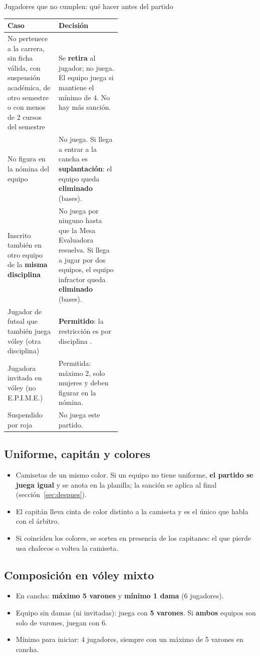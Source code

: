 \begin{cajaImportante}{Jugadores que no cumplen: qué hacer antes del partido}
	\renewcommand{\arraystretch}{1.3}
	\noindent\begin{tabularx}{\linewidth}{>{\RaggedRight\arraybackslash}p{0.45\linewidth} >{\RaggedRight\arraybackslash}X}
		\textbf{Caso} & \textbf{Decisión}\\ \hline
		No pertenece a la carrera, sin ficha válida, con suspensión académica, de otro semestre o con menos de 2 cursos del semestre & Se \textbf{retira} al jugador; no juega. El equipo juega si mantiene el mínimo de 4. No hay más sanción.\\
		No figura en la nómina del equipo & No juega. Si llega a entrar a la cancha es \textbf{suplantación}: el equipo queda \textbf{eliminado} (bases).\\
		Inscrito también en otro equipo de la \textbf{misma disciplina} & No juega por ninguno hasta que la Mesa Evaluadora resuelva. Si llega a jugar por dos equipos, el equipo infractor queda \textbf{eliminado} (bases).\\
		Jugador de futsal que también juega vóley (otra disciplina) & \textbf{Permitido}: la restricción es por disciplina \crit{2}.\\
		Jugadora invitada en vóley (no E.P.I.M.E.) & Permitida: máximo 2, solo mujeres y deben figurar en la nómina.\\
		Suspendido por roja & No juega este partido.\\
	\end{tabularx}
\end{cajaImportante}

\subsection{Uniforme, capitán y colores}
\begin{itemize}
	\item Camisetas de un mismo color. Si un equipo no tiene uniforme, \textbf{el partido se juega igual} y se anota en la planilla; la sanción se aplica al final (sección~\ref{sec:despues}).
	\item El capitán lleva cinta de color distinto a la camiseta y es el único que habla con el árbitro.
	\item Si coinciden los colores, se sortea en presencia de los capitanes: el que pierde usa chalecos o voltea la camiseta.
\end{itemize}

\subsection{Composición en vóley mixto}
\begin{itemize}
	\item En cancha: \textbf{máximo 5 varones} y \textbf{mínimo 1 dama} (6 jugadores).
	\item Equipo sin damas (ni invitadas): juega con \textbf{5 varones}. Si \textbf{ambos} equipos son solo de varones, juegan con 6.
	\item Mínimo para iniciar: 4 jugadores, siempre con un máximo de 5 varones en cancha.
\end{itemize}

